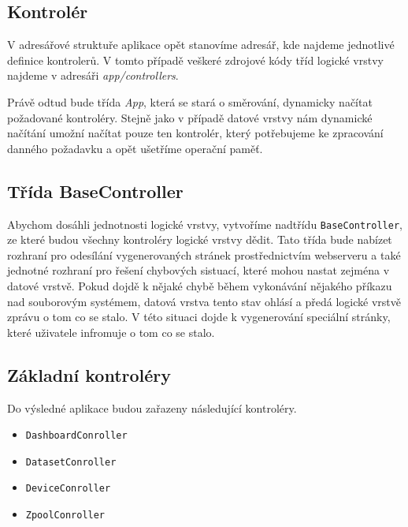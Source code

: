     \subsection{Kontrolér}
    V adresářové struktuře aplikace opět stanovíme adresář, kde najdeme jednotlivé definice kontrolerů. V tomto případě veškeré zdrojové kódy tříd logické vrstvy najdeme v adresáři \emph{app/controllers}.
    \begin{figure}
      \centering
    \end{figure}
   

    Právě odtud bude třída \emph{App}, která se stará o směrování, dynamicky načítat požadované kontroléry. Stejně jako v případě datové vrstvy nám dynamické načítání umožní načítat pouze ten kontrolér, který potřebujeme ke zpracování danného požadavku a opět ušetříme operační paměť.

    \subsection{Třída BaseController}
    Abychom dosáhli jednotnosti logické vrstvy, vytvoříme nadtřídu \verb|BaseController|, ze které budou všechny kontroléry logické vrstvy dědit. Tato třída bude nabízet rozhraní pro odesílání vygenerovaných stránek prostřednictvím webserveru a také jednotné rozhraní pro řešení chybových sistuací, které mohou nastat zejména v datové vrstvě. Pokud dojdě k nějaké chybě během vykonávání nějakého příkazu nad souborovým systémem, datová vrstva tento stav ohlásí a předá logické vrstvě zprávu o tom co se stalo. V této situaci dojde k vygenerování speciální stránky, které uživatele infromuje o tom co se stalo.
    \subsection{Základní kontroléry}
    Do výsledné aplikace budou zařazeny následující kontroléry.
    \begin{itemize}
      \item \verb|DashboardConroller|
      \item \verb|DatasetConroller|
      \item \verb|DeviceConroller|
      \item \verb|ZpoolConroller|
    \end{itemize}

